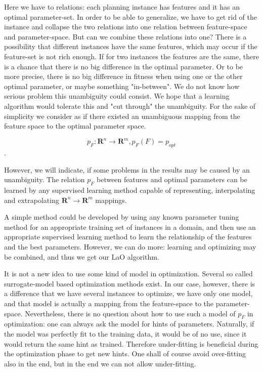 \documentclass{acm_proc_article-sp}
\begin{document}
Here we have to relations: each planning instance has features and it has an optimal parameter-set. In order to be able to generalize, we have to get rid of the instance and collapse the two relations into one relation between feature-space and parameter-space. But can we combine these relations into one? There is a possibility that different instances have the same features, which may occur if the feature-set is not rich enough. If for two instances the features are the same, there is a chance that there is no big difference in the optimal parameter. Or to be more precise, there is no big difference in fitness when using one or the other optimal parameter, or maybe something "in-between". We do not know how serious problem this unambiguity could consist. We hope that a learning algorithm would tolerate this and "cut through" the unambiguity. For the sake of simplicity we consider as if there existed an unambiguous mapping from the feature space to the optimal parameter space. 

\begin{equation} p_F: \mathbf{R}^n \to \mathbf{R}^m, p_F(F)=p_{opt} \end{equation}.	

However, we will indicate, if some problems in the results may be caused by an unambiguity. The relation \begin{math} p_F \end{math} between features and optimal parameters can be learned by any supervised learning method capable of representing, interpolating and extrapolating  \begin{math}\mathbf{R}^n\to \mathbf{R}^m \end{math} mappings. 

A simple method could be developed by using any known parameter tuning method for an appropriate training set of instances in a domain, and then use an appropriate supervised learning method to learn the relationship of the features and the best parameters. However, we can do more: learning and optimizing may be combined, and thus we get our LaO algorithm.

It is not a new idea to use some kind of model in optimization. Several so called surrogate-model based optimization methods exist. In our case, however, there is a difference that we have several instances to optimize, we have only one model, and that model is actually a mapping from the feature-space to the parameter-space. Nevertheless, there is no question about how to use such a model of \begin{math}p_F\end{math} in optimization: one can always ask the model for hints of parameters. Naturally, if the model was perfectly fit to the training data, it would be of no use, since it would return the same hint as trained. Therefore under-fitting is beneficial during the optimization phase to get new hints. One shall of course avoid over-fitting also in the end, but in the end we can not allow under-fitting.
\end{document}
